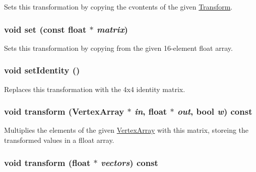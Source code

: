 Sets this transformation by copying the cvontents of the given \hyperlink{classm3g_1_1Transform}{Transform}. \hypertarget{classm3g_1_1Transform_d1a2203142a848286c80d66c8c7fa37d}{
\subsubsection[{set}]{\setlength{\rightskip}{0pt plus 5cm}void set (const float $\ast$ {\em matrix})}}
\label{classm3g_1_1Transform_d1a2203142a848286c80d66c8c7fa37d}


Sets this transformation by copying from the given 16-element float array. \hypertarget{classm3g_1_1Transform_382e6ad7e6721b121e510959e1011be3}{
\subsubsection[{setIdentity}]{\setlength{\rightskip}{0pt plus 5cm}void setIdentity ()}}
\label{classm3g_1_1Transform_382e6ad7e6721b121e510959e1011be3}


Replaces this transformation with the 4x4 identity matrix. \hypertarget{classm3g_1_1Transform_557e326db393b8a1ce23455978af32dc}{
\subsubsection[{transform}]{\setlength{\rightskip}{0pt plus 5cm}void transform ({\bf VertexArray} $\ast$ {\em in}, \/  float $\ast$ {\em out}, \/  bool {\em w}) const}}
\label{classm3g_1_1Transform_557e326db393b8a1ce23455978af32dc}


Multiplies the elements of the given \hyperlink{classm3g_1_1VertexArray}{VertexArray} with this matrix, storeing the transformed values in a flloat array. \hypertarget{classm3g_1_1Transform_0b85978885624f651df63da4137692df}{
\subsubsection[{transform}]{\setlength{\rightskip}{0pt plus 5cm}void transform (float $\ast$ {\em vectors}) const}}
\label{classm3g_1_1Transform_0b85978885624f651df63da4137692df}


